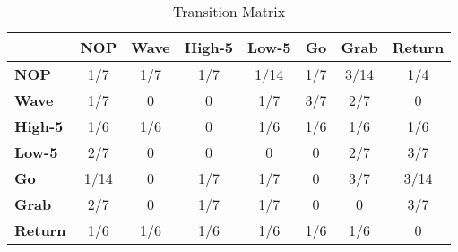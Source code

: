 \begin{table*}[t]
\centering
\caption{Transition Matrix}
\label{transition_matrix}
\begin{tabular}{|l|ccccccc|}
\hline
 & \multicolumn{1}{c|}{\textbf{NOP}} & \multicolumn{1}{c|}{\textbf{Wave}} & \multicolumn{1}{c|}{\textbf{High-5}} & \multicolumn{1}{c|}{\textbf{Low-5}} & \multicolumn{1}{c|}{\textbf{Go}} & \multicolumn{1}{c|}{\textbf{Grab}} & \textbf{Return} \\ \hline
\textbf{NOP} & 1/7 & 1/7 & 1/7 & 1/14 & 1/7 & 3/14 & 1/4 \\ \cline{1-1}
\textbf{Wave} & 1/7 & 0 & 0 & 1/7 & 3/7 & 2/7 & 0 \\ \cline{1-1}
\textbf{High-5} & 1/6 & 1/6 & 0 & 1/6 & 1/6 & 1/6 & 1/6 \\ \cline{1-1}
\textbf{Low-5} & 2/7 & 0 & 0 & 0 & 0 & 2/7 & 3/7 \\ \cline{1-1}
\textbf{Go} & 1/14 & 0 & 1/7 & 1/7 & 0 & 3/7 & 3/14 \\ \cline{1-1}
\textbf{Grab} & 2/7 & 0 & 1/7 & 1/7 & 0 & 0 & 3/7 \\ \cline{1-1}
\textbf{Return} & 1/6 & 1/6 & 1/6 & 1/6 & 1/6 & 1/6 & 0 \\ \hline
\end{tabular}

\end{table*}